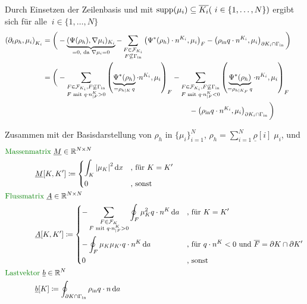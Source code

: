 Durch Einsetzen der Zeilenbasis und mit $ \operatorname{supp}(\mu_i) \subseteq \overline{K_i} (\ i \in \{1, \dots , N\})$ ergibt sich für alle $\ i \in \{1, \dots , N\}$ 
\begin{align*}
	\left(\partial_t \rho_h, \mu_i  \right)_{K_i}  &= \bigg( -\underbrace{(\Psi(\rho_h), \nabla\mu_i)_{K_i}}_{=0 \text{, da } \nabla \mu_i = 0} - \sum_{\substack{F \in \mathcal{F}_{K_i} \\ F \not\subseteq \Gamma_{{\text{in}}}}} \left(\Psi^*(\rho_h) \cdot n^{K_i}, \mu_i \right)_{F} - \left(\rho_{\text{in}} q \cdot n^{K_i}, \mu_i \right)_{\partial K_i \cap \Gamma_{{\text{in}}}} \bigg) \\
	&= \bigg( - \sum_{\substack{F \in \mathcal{F}_{K_i}, F \not\subseteq \Gamma_{{\text{in}}}\\ F \text{ mit }q \cdot n^K_{|F} > 0} } \left(\underbrace{\Psi^*(\rho_h)}_{= \rho_{h|K}\, q} \cdot n^{K_i}, \mu_i \right)_{F} - \sum_{\substack{F \in \mathcal{F}_{K_i}, F \not\subseteq \Gamma_{{\text{in}}}\\ F \text{ mit }q \cdot n^K_{|F} < 0} } \left(\underbrace{\Psi^*(\rho_h)}_{= \rho_{h|K_F} \, q} \cdot n^{K_i}, \mu_i \right)_{F}\\
	& \qquad \qquad \qquad \qquad \qquad \qquad  \qquad \qquad\qquad \qquad- \left(\rho_{\text{in}} q \cdot n^{K_i}, \mu_i \right)_{\partial K_i \cap \Gamma_{{\text{in}}}} \bigg)\qquad \qquad
\end{align*} 

Zusammen mit der Basisdarstellung von $ \rho_h $ in $\{\mu_i  \}_{i=1}^N$, $ \rho_h = \sum_{i=1}^{N} \underline{\rho}[i] \; \mu_i$, und 
\begin{align*}
&\text{\defi{Massenmatrix} } \underline{M}\in \R^{N \times N} \\  &\qquad \qquad \underline{M}[K,K'] \coloneqq \begin{dcases}
\int_K \abs{\mu_K}^2 \diff x & \text{, für } K = K' \\
0 &\text{, sonst}
\end{dcases} \\
&\text{\defi{Flussmatrix} } \underline{A}\in \R^{N \times N} \\ &\qquad \qquad \underline{A}[K,K'] \coloneqq \begin{dcases}
- \sum_{\substack{F\in \mathcal{F}_K \\ F \text{ mit } q\cdot n^K_{|F} > 0}} \oint_F \mu_K^2 q \cdot n^K \diff a& \text{, für } K = K' \\
- \oint_F \mu_K \mu_{K'} q \cdot n^K \diff a &\text{, für } q \cdot n^K< 0 \text{ und } \overline{F} = \partial K \cap \partial K'\\
0 &\text{, sonst}
\end{dcases} \\
&\text{\defi{Lastvektor} } \underline{b}\in \R^{N} \\ &\qquad \qquad\underline{b}[K] \coloneqq \oint_{\partial K \cap \Gammain} \rhoin q \cdot n \diff a
\end{align*}


